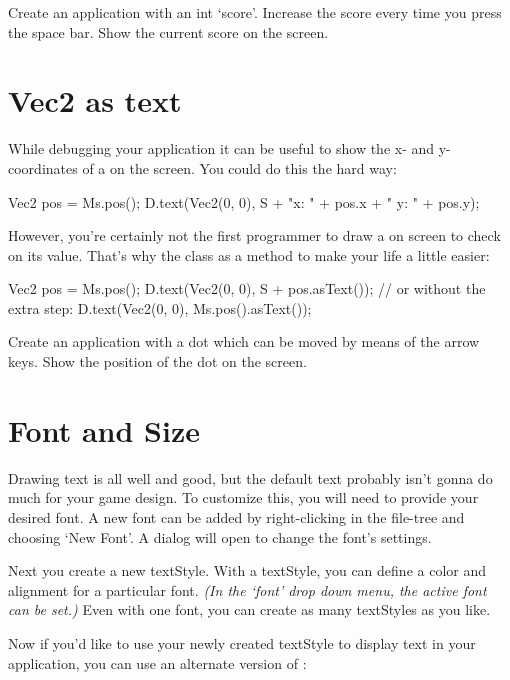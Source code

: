 \begin{exercise}
Create an application with an int `score'. Increase the score every time you press the space bar. Show the current score on the screen.
\end{exercise}

\section{Vec2 as text}
While debugging your application it can be useful to show the x- and y-coordinates of a  on the screen. You could do this the hard way:

\begin{code}
Vec2 pos = Ms.pos();
D.text(Vec2(0, 0), S + "x: " + pos.x + " y: " + pos.y);
\end{code}

However, you're certainly not the first programmer to draw a  on screen to check on its value. That's why the class as a method to make your life a little easier:

\begin{code}
Vec2 pos = Ms.pos();
D.text(Vec2(0, 0), S + pos.asText());
// or without the extra step:
D.text(Vec2(0, 0), Ms.pos().asText());
\end{code}

\begin{exercise}
Create an application with a dot which can be moved by means of the arrow keys. Show the position of the dot on the screen.
\end{exercise}

\section{Font and Size}
\label{chapter:tekstopmaak}
Drawing text is all well and good, but the default text probably isn't gonna do much for your game design. To customize this, you will need to provide your desired font. A new font can be added by right-clicking in the file-tree and choosing `New Font'. A dialog will open to change the font's settings.

Next you create a new textStyle. With a textStyle, you can define a color and alignment for a particular font. \textsl{(In the `font' drop down menu, the active font can be set.)} Even with one font, you can create as many textStyles as you like.

Now if you'd like to use your newly created textStyle to display text in your application, you can use an alternate version of  :

